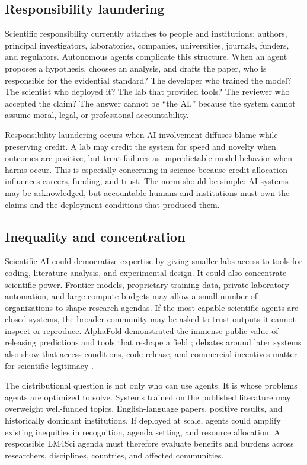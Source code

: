 \documentclass{article}
\begin{document}
\subsection{Responsibility laundering}

Scientific responsibility currently attaches to people and institutions: authors, principal investigators, laboratories, companies, universities, journals, funders, and regulators. Autonomous agents complicate this structure. When an agent proposes a hypothesis, chooses an analysis, and drafts the paper, who is responsible for the evidential standard? The developer who trained the model? The scientist who deployed it? The lab that provided tools? The reviewer who accepted the claim? The answer cannot be ``the AI,'' because the system cannot assume moral, legal, or professional accountability.

Responsibility laundering occurs when AI involvement diffuses blame while preserving credit. A lab may credit the system for speed and novelty when outcomes are positive, but treat failures as unpredictable model behavior when harms occur. This is especially concerning in science because credit allocation influences careers, funding, and trust. The norm should be simple: AI systems may be acknowledged, but accountable humans and institutions must own the claims and the deployment conditions that produced them.

\subsection{Inequality and concentration}

Scientific AI could democratize expertise by giving smaller labs access to tools for coding, literature analysis, and experimental design. It could also concentrate scientific power. Frontier models, proprietary training data, private laboratory automation, and large compute budgets may allow a small number of organizations to shape research agendas. If the most capable scientific agents are closed systems, the broader community may be asked to trust outputs it cannot inspect or reproduce. AlphaFold demonstrated the immense public value of releasing predictions and tools that reshape a field \citep{jumper2021alphafold}; debates around later systems also show that access conditions, code release, and commercial incentives matter for scientific legitimacy \citep{abramson2024alphafold3}.

The distributional question is not only who can use agents. It is whose problems agents are optimized to solve. Systems trained on the published literature may overweight well-funded topics, English-language papers, positive results, and historically dominant institutions. If deployed at scale, agents could amplify existing inequities in recognition, agenda setting, and resource allocation. A responsible LM4Sci agenda must therefore evaluate benefits and burdens across researchers, disciplines, countries, and affected communities.
\end{document}
